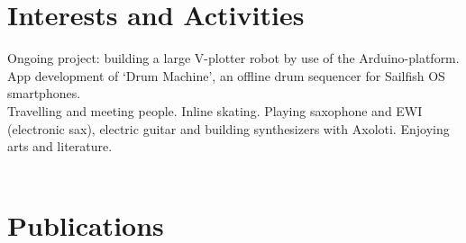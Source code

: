 \documentclass[a4paper,10pt]{article} %
\begin{document}



\newpage
\section{Interests and Activities}

Ongoing project: building a large V-plotter robot by use of the Arduino-platform. \vspace{0.2cm} \\ 
App development of `Drum Machine', an offline drum sequencer for Sailfish OS smartphones.\vspace{0.2cm} \\ 
Travelling and meeting people. Inline skating. Playing saxophone and EWI (electronic sax), electric guitar and building synthesizers with Axoloti. Enjoying arts and literature.
\\
\\





\section{Publications}


\nocite{*}
\renewcommand*{\bibfont}{\small}
\printbibliography[heading=none]

%
%
\end{document}
